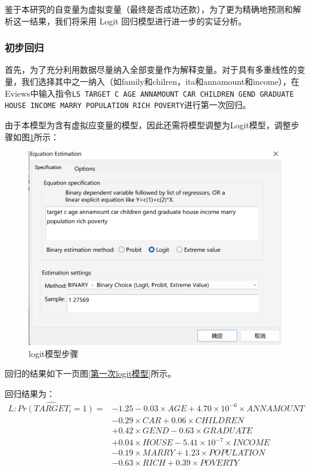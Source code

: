 \documentclass[13.5pt,hyperref,a4paper,UTF8]{ctexart}
\begin{document}
鉴于本研究的自变量为虚拟变量（最终是否成功还款），为了更为精确地预测和解析这一结果，我们将采用 Logit 回归模型进行进一步的实证分析。

\subsubsection{初步回归}
首先，为了充分利用数据尽量纳入全部变量作为解释变量。对于具有多重线性的变量，我们选择其中之一纳入（如family和chilren，ita和annamount和income），在Eviews中输入指令\texttt{LS TARGET C AGE ANNAMOUNT CAR CHILDREN GEND GRADUATE HOUSE INCOME MARRY POPULATION RICH POVERTY}进行第一次回归。

由于本模型为含有虚拟应变量的模型，因此还需将模型调整为Logit模型，调整步骤如图\ref{logit模型步骤模型1}所示：

\begin{figure}[H]
    \centering
    \includegraphics[width =.7\textwidth]{figures/3回归/回归1/logit模型步骤.png}
    \caption{logit模型步骤}
    \label{logit模型步骤模型1}
\end{figure}

回归的结果如下一页图\ref{第一次logit模型}所示。

回归结果为：
\begin{equation}
\begin{split}
 \widehat{L:Pr(TARGET_i=1)}=&-1.25 - 0.03\times AGE + 4.70\times 10^{-6}\times ANNAMOUNT \\ & - 0.29\times CAR + 0.06\times CHILDREN \\ & + 0.42\times GEND - 0.63\times GRADUATE \\ & + 0.04\times HOUSE - 5.41\times10^{-7}\times INCOME \\ & - 0.19\times MARRY + 1.23\times POPULATION \\ & - 0.63\times RICH + 0.39\times POVERTY
\end{split}
\end{equation}
\end{document}
